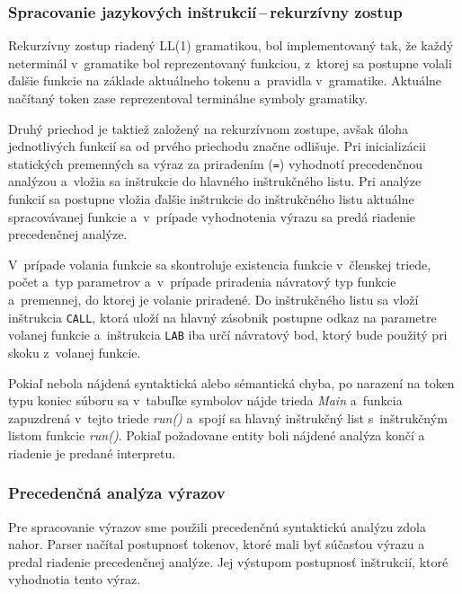 \documentclass[11pt,a4paper]{article}
\begin{document}
	
	
	\subsubsection{Spracovanie jazykových inštrukcií\,--\,rekurzívny zostup}
	\label{rekurzia}
	Rekurzívny zostup riadený LL(1) gramatikou, bol implementovaný tak, že každý
	neterminál v~gramatike bol reprezentovaný funkciou, z~ktorej sa postupne
	volali ďalšie funkcie na základe aktuálneho tokenu a~pravidla v~gramatike.
	Aktuálne načítaný token zase reprezentoval terminálne symboly gramatiky.
	
	Druhý priechod je taktiež založený na rekurzívnom zostupe, avšak úloha
	jednotlivých funkcií sa od prvého priechodu značne odlišuje.
	Pri inicializácii statických premenných sa výraz za priradením (\texttt{=})
	vyhodnotí precedenčnou analýzou a~vložia sa inštrukcie do hlavného
	inštrukčného listu. Pri analýze funkcií sa postupne vložia ďalšie inštrukcie
	do inštrukčného listu aktuálne spracovávanej funkcie a~v~prípade vyhodnotenia
	výrazu  sa predá riadenie precedenčnej analýze.
	
	V~prípade volania funkcie sa skontroluje existencia funkcie v~členskej
	triede, počet a~typ parametrov a~v~prípade priradenia  návratový typ
	funkcie a~premennej, do ktorej je volanie priradené. Do inštrukčného
	listu sa vloží inštrukcia \texttt{CALL}, ktorá uloží na hlavný zásobnik
	postupne odkaz na parametre volanej funkcie a~inštrukcia \texttt{LAB}
	iba určí návratový bod, ktorý bude použitý pri skoku z~volanej funkcie.
	
	Pokiaľ nebola nájdená syntaktická alebo sémantická chyba, po narazení na
	token typu koniec súboru sa v~tabuľke symbolov nájde trieda \emph{Main}
	a~funkcia zapuzdrená v~tejto triede \emph{run()} a~spojí sa hlavný inštrukčný
	list s~inštrukčným listom funkcie \emph{run()}. Pokiaľ požadovane entity
	boli nájdené analýza končí a riadenie je predané interpretu.
	
	\subsubsection{Precedenčná analýza výrazov}
	\label{precedencna analyza}
	
	Pre spracovanie výrazov sme použili precedenčnú syntaktickú analýzu zdola nahor.
	Parser načítal postupnosť tokenov, ktoré mali byť súčasťou výrazu a predal
	riadenie precedenčnej analýze. Jej výstupom postupnosť inštrukcií, ktoré vyhodnotia tento výraz.
	
\end{document}
